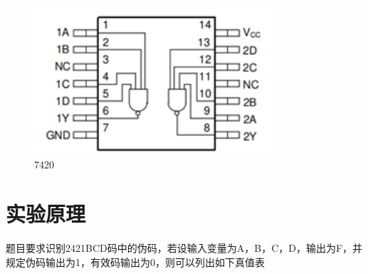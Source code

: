 \documentclass{ctexart}
\begin{document}
\begin{figure}[H]
\begin{minipage}{0.28\textwidth}
    \centering
           \includegraphics[width=0.8\textwidth]{fig/7420.png}
           \caption{7420}
    \label{}
    \end{minipage}
\end{figure}
\section{实验原理}
题目要求识别2421BCD码中的伪码，若设输入变量为A，B，C，D，输出为F，并规定伪码输出为1，有效码输出为0，则可以列出如下真值表
\end{document}
